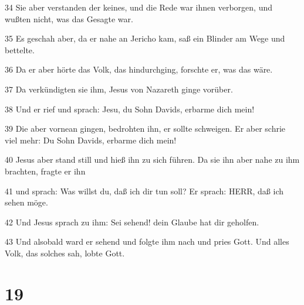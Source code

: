 \par 34 Sie aber verstanden der keines, und die Rede war ihnen verborgen, und wußten nicht, was das Gesagte war.
\par 35 Es geschah aber, da er nahe an Jericho kam, saß ein Blinder am Wege und bettelte.
\par 36 Da er aber hörte das Volk, das hindurchging, forschte er, was das wäre.
\par 37 Da verkündigten sie ihm, Jesus von Nazareth ginge vorüber.
\par 38 Und er rief und sprach: Jesu, du Sohn Davids, erbarme dich mein!
\par 39 Die aber vornean gingen, bedrohten ihn, er sollte schweigen. Er aber schrie viel mehr: Du Sohn Davids, erbarme dich mein!
\par 40 Jesus aber stand still und hieß ihn zu sich führen. Da sie ihn aber nahe zu ihm brachten, fragte er ihn
\par 41 und sprach: Was willst du, daß ich dir tun soll? Er sprach: HERR, daß ich sehen möge.
\par 42 Und Jesus sprach zu ihm: Sei sehend! dein Glaube hat dir geholfen.
\par 43 Und alsobald ward er sehend und folgte ihm nach und pries Gott. Und alles Volk, das solches sah, lobte Gott.

\chapter{19}

